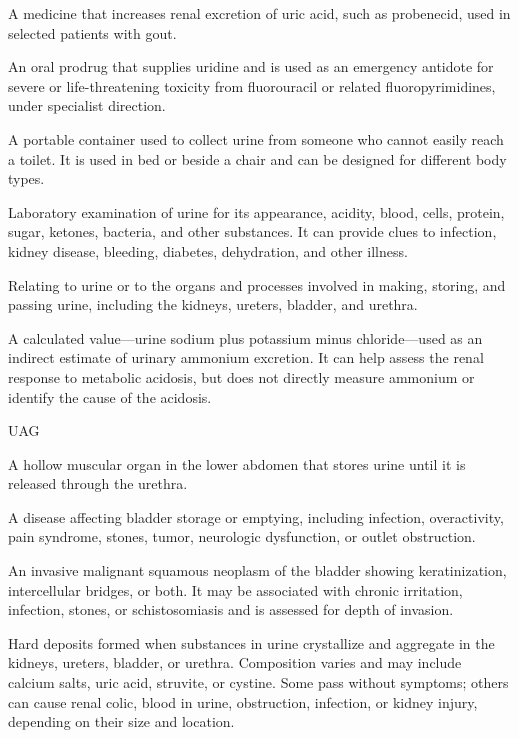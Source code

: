  A medicine that increases renal excretion of uric acid, such as probenecid, used in selected patients with gout.

 An oral prodrug that supplies uridine and is used as an emergency antidote for severe or life-threatening toxicity from fluorouracil or related fluoropyrimidines, under specialist direction.

 A portable container used to collect urine from someone who cannot easily reach a toilet. It is used in bed or beside a chair and can be designed for different body types.

 Laboratory examination of urine for its appearance, acidity, blood, cells, protein, sugar, ketones, bacteria, and other substances. It can provide clues to infection, kidney disease, bleeding, diabetes, dehydration, and other illness.

 Relating to urine or to the organs and processes involved in making, storing, and passing urine, including the kidneys, ureters, bladder, and urethra.

 A calculated value—urine sodium plus potassium minus chloride—used as an indirect estimate of urinary ammonium excretion. It can help assess the renal response to metabolic acidosis, but does not directly measure ammonium or identify the cause of the acidosis.

\synonyms
UAG

 A hollow muscular organ in the lower abdomen that stores urine until it is released through the urethra.

 A disease affecting bladder storage or emptying, including infection, overactivity, pain syndrome, stones, tumor, neurologic dysfunction, or outlet obstruction.

 An invasive malignant squamous neoplasm of the bladder showing keratinization, intercellular bridges, or both. It may be associated with chronic irritation, infection, stones, or schistosomiasis and is assessed for depth of invasion.

 Hard deposits formed when substances in urine crystallize and
aggregate in the kidneys, ureters, bladder, or urethra. Composition varies and may include
calcium salts, uric acid, struvite, or cystine. Some pass without symptoms; others can
cause renal colic, blood in urine, obstruction, infection, or kidney injury, depending on
their size and location.

